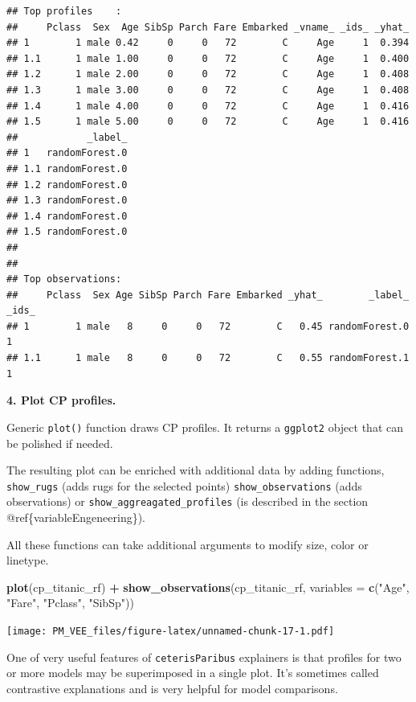 \documentclass[]{krantz}
\newenvironment{Shaded}{\begin{snugshade}}{\end{snugshade}}
\newcommand{\DataTypeTok}[1]{\textcolor[rgb]{0.13,0.29,0.53}{#1}}
\newcommand{\KeywordTok}[1]{\textcolor[rgb]{0.13,0.29,0.53}{\textbf{#1}}}
\newcommand{\NormalTok}[1]{#1}
\newcommand{\OperatorTok}[1]{\textcolor[rgb]{0.81,0.36,0.00}{\textbf{#1}}}
\newcommand{\StringTok}[1]{\textcolor[rgb]{0.31,0.60,0.02}{#1}}
\theoremstyle{definition}
\theoremstyle{definition}
\theoremstyle{definition}
\theoremstyle{remark}
\begin{document}
\begin{verbatim}
## Top profiles    : 
##     Pclass  Sex  Age SibSp Parch Fare Embarked _vname_ _ids_ _yhat_
## 1        1 male 0.42     0     0   72        C     Age     1  0.394
## 1.1      1 male 1.00     0     0   72        C     Age     1  0.400
## 1.2      1 male 2.00     0     0   72        C     Age     1  0.408
## 1.3      1 male 3.00     0     0   72        C     Age     1  0.408
## 1.4      1 male 4.00     0     0   72        C     Age     1  0.416
## 1.5      1 male 5.00     0     0   72        C     Age     1  0.416
##            _label_
## 1   randomForest.0
## 1.1 randomForest.0
## 1.2 randomForest.0
## 1.3 randomForest.0
## 1.4 randomForest.0
## 1.5 randomForest.0
## 
## 
## Top observations:
##     Pclass  Sex Age SibSp Parch Fare Embarked _yhat_        _label_ _ids_
## 1        1 male   8     0     0   72        C   0.45 randomForest.0     1
## 1.1      1 male   8     0     0   72        C   0.55 randomForest.1     1
\end{verbatim}

\textbf{4. Plot CP profiles.}

Generic \texttt{plot()} function draws CP profiles. It returns a
\texttt{ggplot2} object that can be polished if needed.

The resulting plot can be enriched with additional data by adding
functions, \texttt{show\_rugs} (adds rugs for the selected points)
\texttt{show\_observations} (adds observations) or
\texttt{show\_aggreagated\_profiles} (is described in the section
@ref\{variableEngeneering\}).

All these functions can take additional arguments to modify size, color
or linetype.

\begin{Shaded}
\begin{Highlighting}[]
\KeywordTok{plot}\NormalTok{(cp_titanic_rf) }\OperatorTok{+}
\StringTok{  }\KeywordTok{show_observations}\NormalTok{(cp_titanic_rf, }
        \DataTypeTok{variables =} \KeywordTok{c}\NormalTok{(}\StringTok{"Age"}\NormalTok{, }\StringTok{"Fare"}\NormalTok{, }\StringTok{"Pclass"}\NormalTok{, }\StringTok{"SibSp"}\NormalTok{)) }
\end{Highlighting}
\end{Shaded}

\texttt{[image: PM\_VEE\_files/figure-latex/unnamed-chunk-17-1.pdf]}

One of very useful features of \texttt{ceterisParibus} explainers is
that profiles for two or more models may be superimposed in a single
plot. It's sometimes called contrastive explanations and is very helpful
for model comparisons.
\end{document}
